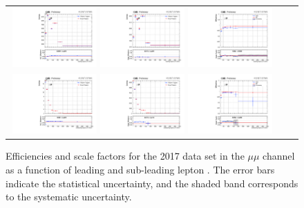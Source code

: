 \begin{figure}[h]
  \begin{center}
    \begin{tabular}{ccc}
      \includegraphics[width=0.32\textwidth]{fig_2017_TrigSF/g_lepApt_mumu_MC.pdf}
      \includegraphics[width=0.32\textwidth]{fig_2017_TrigSF/g_lepApt_mumu_data.pdf}
      \includegraphics[width=0.32\textwidth]{fig_2017_TrigSF/g_mumu_lepApt_FullSystUncBand.pdf}\\
      \includegraphics[width=0.32\textwidth]{fig_2017_TrigSF/g_lepBpt_mumu_MC.pdf}
      \includegraphics[width=0.32\textwidth]{fig_2017_TrigSF/g_lepBpt_mumu_data.pdf}
      \includegraphics[width=0.32\textwidth]{fig_2017_TrigSF/g_mumu_lepBpt_FullSystUncBand.pdf}\\
    \end{tabular}
    \caption{Efficiencies and scale factors for the 2017 data set in the $\mu\mu$ channel as a function of leading and sub-leading lepton \pT.
            The error bars indicate the statistical uncertainty, and the shaded band corresponds to the systematic uncertainty.
            }
    \label{TrigSF_2017_3}
  \end{center}
\end{figure}

